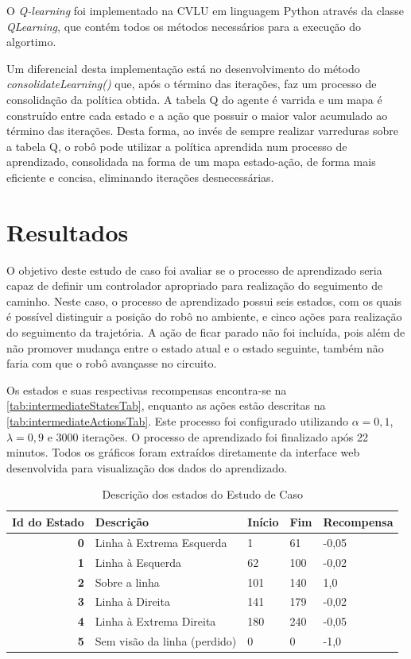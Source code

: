 \documentclass[a4paper]{ifacconf}
\begin{document}
O \textit{Q-learning} foi implementado na CVLU em linguagem Python através da classe \textit{QLearning}, que contém todos os métodos necessários para a execução do algortimo.

Um diferencial desta implementação está no desenvolvimento do método \textit{consolidateLearning()} que, após o término das iterações, faz um processo de consolidação da política obtida. A tabela Q do agente é varrida e um mapa é construído entre cada estado e a ação que possuir o maior valor acumulado ao término das iterações. Desta forma, ao invés de sempre realizar varreduras sobre a tabela Q, o robô pode utilizar a política aprendida num processo de aprendizado, consolidada na forma de um mapa estado-ação, de forma mais eficiente e concisa, eliminando iterações desnecessárias.

\section{Resultados}

O objetivo deste estudo de caso foi avaliar se o processo de aprendizado seria capaz de definir um controlador apropriado para realização do seguimento de caminho. Neste caso, o processo de aprendizado possui seis estados, com os quais é possível distinguir a posição do robô no ambiente, e cinco ações para realização do seguimento da trajetória. A ação de ficar parado não foi incluída, pois além de não promover mudança entre o estado atual e o estado seguinte, também não faria com que o robô avançasse no circuito. 

Os estados e suas respectivas recompensas encontra-se na \autoref{tab:intermediateStatesTab}, enquanto as ações estão descritas na \autoref{tab:intermediateActionsTab}. Este processo foi configurado utilizando $\alpha = 0,1$, $\lambda = 0,9$ e 3000 iterações. O processo de aprendizado foi finalizado após 22 minutos. Todos os gráficos foram extraídos diretamente da interface web desenvolvida para visualização dos dados do aprendizado.

\begin{table}
\centering
\ABNTEXfontereduzida
\caption{Descrição dos estados do Estudo de Caso} \label{tab:intermediateStatesTab}
\begin{tabular}{r|p{5cm}|p{1cm}|p{1cm}|p{2.5cm}}
\textbf{Id do Estado} & Descrição & Início & Fim & Recompensa\\ \hline
\textbf{0} & Linha à Extrema Esquerda & 1 & 61 & -0,05 \\ \hline
\textbf{1} & Linha à Esquerda & 62 & 100 & -0,02 \\ \hline
\textbf{2} & Sobre a linha & 101 & 140 & 1,0\\ \hline
\textbf{3} & Linha à Direita & 141 & 179 & -0,02\\ \hline
\textbf{4} & Linha à Extrema Direita & 180 & 240 & -0,05\\ \hline
\textbf{5} & Sem visão da linha (perdido) & 0 & 0 & -1,0\\ \hline
\end{tabular}
\end{table}
\end{document}
